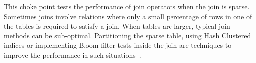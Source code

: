 
This choke point tests the performance of join operators when the join is
sparse. Sometimes joins involve relations where only a small percentage of rows
in one of the tables is required to satisfy a join. When tables are larger,
typical join methods can be sub-optimal. Partitioning the sparse table, using
Hash Clustered indices or implementing Bloom-filter tests inside the join are
techniques to improve the performance in such
situations~\cite{DBLP:journals/csur/Graefe93}.


